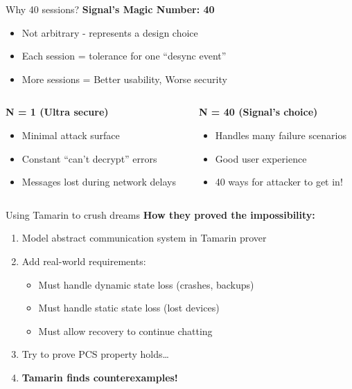 \documentclass[aspectratio=169, lualatex, handout]{beamer}
\begin{document}
\begin{frame}{Why 40 sessions?}
	\textbf{Signal's Magic Number: 40}
	\begin{itemize}
		\item Not arbitrary - represents a design choice
		\item Each session = tolerance for one ``desync event''
		\item More sessions = Better usability, Worse security
	\end{itemize}
	\begin{columns}[c]
		\begin{column}{0.5\textwidth}
			\textbf{N = 1 (Ultra secure)}
			\begin{itemize}
				\item Minimal attack surface
				\item Constant ``can't decrypt'' errors
				\item Messages lost during network delays
			\end{itemize}
		\end{column}
		\begin{column}{0.5\textwidth}
			\textbf{N = 40 (Signal's choice)}
			\begin{itemize}
				\item Handles many failure scenarios
				\item Good user experience
				\item 40 ways for attacker to get in!
			\end{itemize}
		\end{column}
	\end{columns}
\end{frame}

\begin{frame}{Using Tamarin to crush dreams}
	\textbf{How they proved the impossibility:}
	\begin{enumerate}
		\item Model abstract communication system in Tamarin prover
		\item Add real-world requirements:
		      \begin{itemize}
			      \item Must handle dynamic state loss (crashes, backups)
			      \item Must handle static state loss (lost devices)
			      \item Must allow recovery to continue chatting
		      \end{itemize}
		\item Try to prove PCS property holds\ldots
		\item \textbf{Tamarin finds counterexamples!}
	\end{enumerate}
\end{frame}
\end{document}
